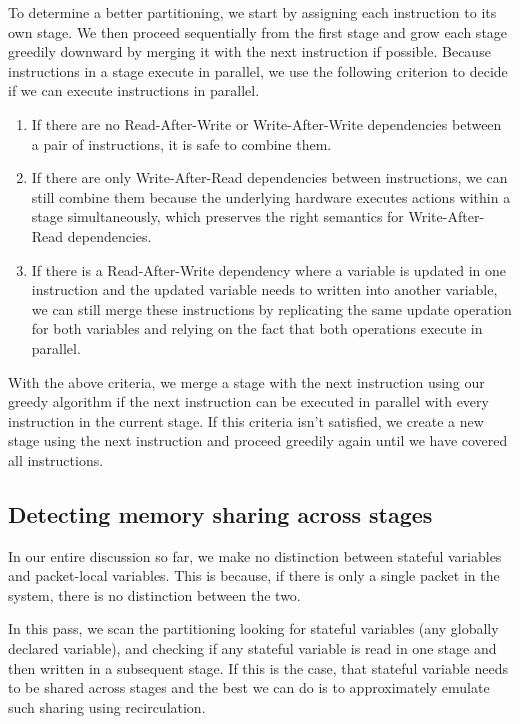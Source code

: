 To determine a better partitioning, we start by assigning each instruction to
its own stage. We then proceed sequentially from the first stage and grow each
stage greedily downward by merging it with the next instruction if possible.
Because instructions in a stage execute in parallel, we use the following
criterion to decide if we can execute instructions in parallel.
\begin{enumerate}
\item If there are no Read-After-Write or Write-After-Write dependencies
between a pair of instructions, it is safe to combine them.
\item If there are only Write-After-Read dependencies between instructions, we
can still combine them because the underlying hardware executes actions within
a stage simultaneously, which preserves the right semantics for
Write-After-Read dependencies.
\item If there is a Read-After-Write dependency where a variable is updated in
one instruction and the updated variable needs to written into another
variable, we can still merge these instructions by replicating the same update
operation for both variables and relying on the fact that both operations
execute in parallel.
\end{enumerate}
With the above criteria, we merge a stage with the next instruction using our
greedy algorithm if the next instruction can be executed in parallel with every
instruction in the current stage. If this criteria isn't satisfied, we create a
new stage using the next instruction and proceed greedily again until we have
covered all instructions.

\subsection{Detecting memory sharing across stages}
In our entire discussion so far, we make no distinction between stateful
variables and packet-local variables. This is because, if there is only a
single packet in the system, there is no distinction between the two.

In this pass, we scan the partitioning looking for stateful variables (any
globally declared variable), and checking if any stateful variable is read in
one stage and then written in a subsequent stage. If this is the case, that
stateful variable needs to be shared across stages and the best we can do is to
approximately emulate such sharing using recirculation.

